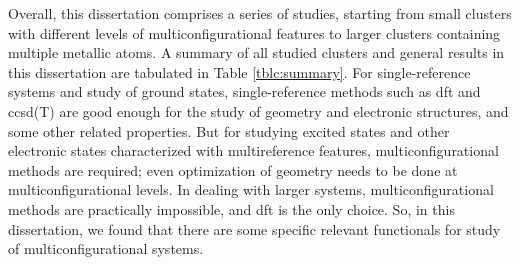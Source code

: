 \begin{refsection}
Overall, this dissertation comprises a series of studies, starting from small clusters with different levels of multiconfigurational features to larger clusters containing multiple metallic atoms. A summary of all studied clusters and general results in this dissertation are tabulated in Table \ref{tblc:summary}. For single-reference systems and study of ground states, single-reference methods such as \acrshort{dft} and \acrshort{ccsd}(T) are good enough for the study of geometry and electronic structures, and some other related properties. But for studying excited states and other electronic states characterized with multireference features, multiconfigurational methods are required; even optimization of geometry needs to be done at multiconfigurational levels. In dealing with larger systems, multiconfigurational methods are practically impossible, and \acrshort{dft} is the only choice. So, in this dissertation, we found that there are some specific relevant functionals for study of multiconfigurational systems.   



\end{refsection}
